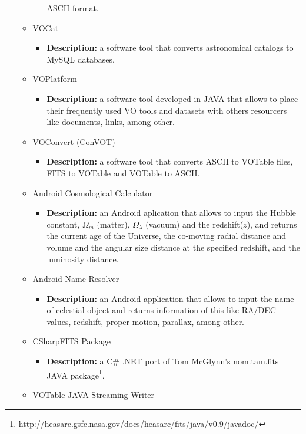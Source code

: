 \begin{itemize}
\begin{itemize}
\begin{itemize}
ASCII format.
\end{itemize}
\item VOCat
\begin{itemize}
\item \textbf{Description:} a software tool that converts astronomical catalogs
to MySQL databases. 
\end{itemize}
\item VOPlatform
\begin{itemize}
\item \textbf{Description:} a software tool developed in JAVA that allows to
place their frequently used VO tools and datasets with others resourcers like
documents, links, among other.
\end{itemize}
\item VOConvert (ConVOT)
\begin{itemize}
\item \textbf{Description:} a software tool that converts ASCII to VOTable
files, FITS to VOTable and VOTable to ASCII.
\end{itemize}
\item Android Cosmological Calculator
\begin{itemize}
\item \textbf{Description:} an Android aplication that allows to input the
Hubble constant, $ \Omega_{m} $ (matter), $ \Omega_{\lambda} $ (vacuum) and the
redshift($ z $), and returns the current age of the Universe, the co-moving
radial distance and volume and the angular size distance at the specified
redshift, and the luminosity distance.
\end{itemize}
\item Android Name Resolver
\begin{itemize}
\item \textbf{Description:} an Android application that allows to input the name
of celestial object and returns information of this like RA/DEC values,
redshift, proper motion, parallax, among other.
\end{itemize}
\item CSharpFITS Package
\begin{itemize}
\item \textbf{Description:} a C\# .NET port of Tom McGlynn's nom.tam.fits JAVA
package\footnote{\url{http://heasarc.gsfc.nasa.gov/docs/heasarc/fits/java/v0.9/javadoc/}}.
\end{itemize}
\item VOTable JAVA Streaming Writer
\begin{itemize}

\end{itemize}
\end{itemize}
\end{itemize}
